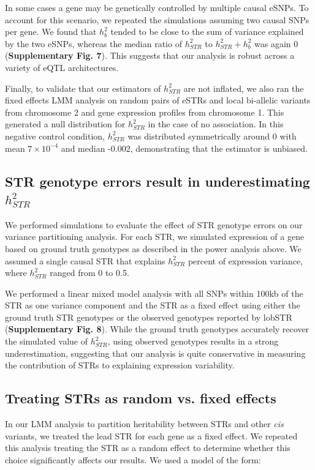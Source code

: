In some cases a gene may be genetically controlled by multiple causal eSNPs. To account for this scenario, we repeated the simulations assuming two causal SNPs per gene. We found that $h^2_b$ tended to be close to the sum of variance explained by the two eSNPs, whereas the median ratio of $h^2_{STR}$ to $h^2_{STR}+h^2_{b}$ was again 0 (\textbf{Supplementary Fig. 7}). This suggests that our analysis is robust across a variety of eQTL architectures.

Finally, to validate that our estimators of $h^2_{STR}$ are not inflated, we also ran the fixed effects LMM analysis on random pairs of eSTRs and local bi-allelic variants from chromosome 2 and gene expression profiles from chromosome 1. This generated a null distribution for $h^2_{STR}$ in the case of no association. In this negative control condition, $h^2_{STR}$ was distributed symmetrically around 0 with mean $7 \times 10^{-4}$ and median -0.002, demonstrating that the estimator is unbiased.

\subsection{STR genotype errors result in underestimating $h^2_{STR}$}

We performed simulations to evaluate the effect of STR genotype errors on our variance partitioning analysis. For each STR, we simulated expression of a gene based on ground truth genotypes as described in the power analysis above. We assumed a single causal STR that explains $h^2_{STR}$ percent of expression variance, where $h^2_{STR}$ ranged from 0 to 0.5. 

We performed a linear mixed model analysis with all SNPs within 100kb of the STR as one variance component and the STR as a fixed effect using either the ground truth STR genotypes or the observed genotypes reported by lobSTR (\textbf{Supplementary Fig. 8}). While the ground truth genotypes accurately recover the simulated value of $h^2_{STR}$, using observed genotypes results in a strong underestimation, suggesting that our analysis is quite conservative in measuring the contribution of STRs to explaining expression variability.

\subsection{Treating STRs as random vs. fixed effects}
In our LMM analysis to partition heritability between STRs and other \emph{cis} variants, we treated the lead STR for each gene as a fixed effect. We repeated this analysis treating the STR as a random effect to determine whether this choice significantly affects our results. We used a model of the form:

